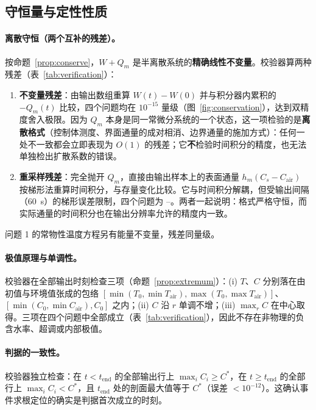 \subsection{守恒量与定性性质}

\paragraph{离散守恒（两个互补的残差）。} 按命题~\ref{prop:conserve}，$W+Q_m$ 是半离散系统的\textbf{精确线性不变量}。校验器算两种残差（表~\ref{tab:verification}）：

\begin{enumerate}[leftmargin=*,itemsep=0.15em,topsep=0.2em]
  \item \textbf{不变量残差}：由输出数组重算 $W(t)-W(0)$ 并与积分器内累积的 $-Q_m(t)$ 比较，四个问题均在 $10^{-15}$ 量级（图~\ref{fig:conservation}），达到双精度舍入极限。因为 $Q_m$ 本身是同一常微分系统的一个状态，这一项检验的是\textbf{离散格式}（控制体测度、界面通量的成对相消、边界通量的施加方式）：任何一处不一致都会立即表现为 $O(1)$ 的残差；它\textbf{不}检验时间积分的精度，也无法单独检出扩散系数的错误。
  \item \textbf{重采样残差}：完全抛开 $Q_m$，直接由输出样本上的表面通量 $h_m(C_s-C_{\mathrm{air}})$ 按梯形法重算时间积分，与存量变化比较。它与时间积分解耦，但受输出间隔（\SI{60}{\second}）的梯形误差限制，四个问题为 \sci{\valSampledResidualQone}--\sci{\valSampledResidualQthree}。两者一起说明：格式严格守恒，而实际通量的时间积分也在输出分辨率允许的精度内一致。
\end{enumerate}
问题 1 的常物性温度方程另有能量不变量，残差同量级。


\paragraph{极值原理与单调性。} 校验器在全部输出时刻检查三项（命题~\ref{prop:extremum}）：(i) $T$、$C$ 分别落在由初值与环境值张成的包络 $[\min(T_0,\min T_{\mathrm{air}}),\max(T_0,\max T_{\mathrm{air}})]$、$[\min(C_0,\min C_{\mathrm{air}}),C_0]$ 之内；(ii) $C$ 沿 $r$ 单调不增；(iii) $\max_rC$ 在中心取得。三项在四个问题中全部成立（表~\ref{tab:verification}），因此不存在非物理的负含水率、超调或内部极值。

\paragraph{判据的一致性。} 校验器独立检查：在 $t<t_{\mathrm{end}}$ 的全部输出行上 $\max_iC_i\ge C^\ast$，在 $t\ge t_{\mathrm{end}}$ 的全部行上 $\max_iC_i<C^\ast$，且 $t_{\mathrm{end}}$ 处的剖面最大值等于 $C^\ast$（误差 $<10^{-12}$）。这确认事件求根定位的确实是判据首次成立的时刻。

